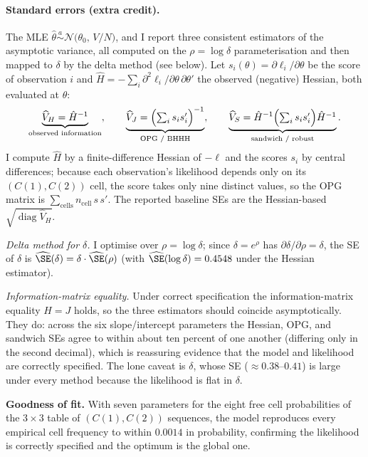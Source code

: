 \documentclass[11pt,english]{article}
\begin{document}
\paragraph{Standard errors (extra credit).} The MLE
$\hat\theta\overset{a}{\sim}\mathcal{N}\!\bigl(\theta_0,\,V/N\bigr)$, and I report
three consistent estimators of the asymptotic variance, all computed on the
$\rho=\log\delta$ parameterisation and then mapped to $\delta$ by the delta
method (see below). Let $s_i(\theta)=\partial\ell_i/\partial\theta$ be the
score of observation $i$ and $\hat H=-\sum_i\partial^2\ell_i/\partial\theta\,\partial\theta'$
the observed (negative) Hessian, both evaluated at $\hat\theta$:
\begin{equation}
\underbrace{\widehat V_{H}=\hat H^{-1}}_{\text{observed information}}
,\qquad
\underbrace{\widehat V_{J}=\Bigl(\textstyle\sum_i s_i s_i'\Bigr)^{-1}}_{\text{OPG / BHHH}}
,\qquad
\underbrace{\widehat V_{S}=\hat H^{-1}\Bigl(\textstyle\sum_i s_i s_i'\Bigr)\hat H^{-1}}_{\text{sandwich / robust}} .
\end{equation}
I compute $\hat H$ by a finite-difference Hessian of $-\ell$ and the scores
$s_i$ by central differences; because each observation's likelihood depends only
on its $(C(1),C(2))$ cell, the score takes only nine distinct values, so the
OPG matrix is $\sum_{\text{cells}} n_{\text{cell}}\,s\,s'$. The reported baseline
SEs are the Hessian-based $\sqrt{\operatorname{diag}\widehat V_{H}}$.

\emph{Delta method for $\delta$.} I optimise over $\rho=\log\delta$; since
$\delta=e^{\rho}$ has $\partial\delta/\partial\rho=\delta$, the SE of $\delta$ is
$\widehat{\SE}(\delta)=\delta\cdot\widehat{\SE}(\rho)$ (with
$\widehat{\SE}(\log\delta)=0.4548$ under the Hessian estimator).

\emph{Information-matrix equality.} Under correct specification the
information-matrix equality $H=J$ holds, so the three estimators should
coincide asymptotically. They do: across the six slope/intercept parameters the
Hessian, OPG, and sandwich SEs agree to within about ten percent of one another
(differing only in the second decimal), which is reassuring evidence
that the model and likelihood are correctly specified. The lone caveat is
$\delta$, whose SE ($\approx0.38$--$0.41$) is large under every method because
the likelihood is flat in $\delta$.

\textbf{Goodness of fit.} With seven parameters for the eight free cell
probabilities of the $3\times3$ table of $(C(1),C(2))$ sequences, the model
reproduces every empirical cell frequency to within $0.0014$ in probability,
confirming the likelihood is correctly specified and the optimum is the global
one.
\end{document}
